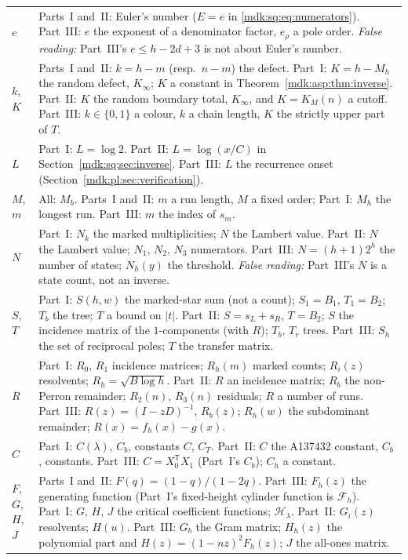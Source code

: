 \documentclass[11pt,letterpaper]{article}
\numberwithin{equation}{section}
\theoremstyle{remark}\newtheorem{remark}[theorem]{Remark}
\begin{document}
\begin{longtable}{@{}>{\raggedright\arraybackslash}p{} >{\raggedright\arraybackslash}p{}@{}}
$e$ & Parts~I and~II: Euler's number ($E=e$ in \eqref{mdk:sq:eq:numerators}). Part~III: $e$ the exponent of a denominator factor, $e_\rho$ a pole order. \emph{False reading:} Part~III's $e\le h-2d+3$ is not about Euler's number.\\
$k$, $K$ & Parts~I and~II: $k=h-m$ (resp.\ $n-m$) the defect. Part~I: $K=h-M_h$ the random defect, $K_\infty$; $K$ a constant in Theorem~\ref{mdk:asp:thm:inverse}. Part~II: $K$ the random boundary total, $K_\infty$, and $K=K_M(n)$ a cutoff. Part~III: $k\in\{0,1\}$ a colour, $k$ a chain length, $K$ the strictly upper part of $T$.\\
$L$ & Part~I: $L=\log2$. Part~II: $L=\log(x/C)$ in Section~\ref{mdk:sq:sec:inverse}. Part~III: $L$ the recurrence onset (Section~\ref{mdk:pl:sec:verification}).\\
$M$, $m$ & All: $M_b$. Parts~I and~II: $m$ a run length, $M$ a fixed order; Part~I: $M_h$ the longest run. Part~III: $m$ the index of $s_m$.\\
$N$ & Part~I: $N_k$ the marked multiplicities; $N$ the Lambert value. Part~II: $N$ the Lambert value; $N_1$, $N_2$, $N_3$ numerators. Part~III: $N=(h+1)2^h$ the number of states; $N_h(y)$ the threshold. \emph{False reading:} Part~III's $N$ is a state count, not an inverse.\\
$S$, $T$ & Part~I: $S(h,w)$ the marked-star sum (not a count); $S_1=B_1$, $T_1=B_2$; $T_b$ the tree; $T$ a bound on $|t|$. Part~II: $S=s_L+s_R$, $T=B_2$; $S$ the incidence matrix of the $1$-components (with $R$); $T_b$, $T_r$ trees. Part~III: $S_h$ the set of reciprocal poles; $T$ the transfer matrix.\\
$R$ & Part~I: $R_0$, $R_1$ incidence matrices; $R_h(m)$ marked counts; $R_i(z)$ resolvents; $R_h=\sqrt{B\log h}$. Part~II: $R$ an incidence matrix; $R_b$ the non-Perron remainder; $R_2(n)$, $R_3(n)$ residuals; $R$ a number of runs. Part~III: $R(z)=(I-zD)^{-1}$, $R_b(z)$; $R_h(w)$ the subdominant remainder; $R(x)=f_h(x)-g(x)$.\\
$C$ & Part~I: $C(\lambda)$, $C_b$, constants $C$, $C_T$. Part~II: $C$ the A137432 constant, $C_b$, constants. Part~III: $C=X_0^{\mathsf T}X_1$ (Part~I's $C_b$); $C_h$ a constant.\\
$F$, $G$, $H$, $J$ & Parts~I and~II: $F(q)=(1-q)/(1-2q)$. Part~III: $F_h(z)$ the generating function (Part~I's fixed-height cylinder function is $\mathcal F_h$). Part~I: $G$, $H$, $J$ the critical coefficient functions; $\mathcal H_\lambda$. Part~II: $G_i(z)$ resolvents; $H(u)$. Part~III: $G_b$ the Gram matrix; $H_h(z)$ the polynomial part and $H(z)=(1-nz)^2F_h(z)$; $J$ the all-ones matrix.\\

\end{longtable}
\end{document}
